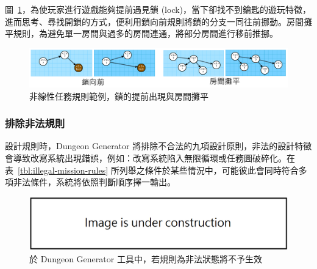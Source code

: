 圖~\ref{fig:missiongrammars-rules-nonlinear-example3}，為使玩家進行遊戲能夠提前遇見鎖 (lock)，當下卻找不到鑰匙的遊玩特徵，進而思考、尋找開鎖的方式，便利用鎖向前規則將鎖的分支一同往前挪動。房間攤平規則，為避免單一房間與過多的房間連通，將部分房間進行移前推挪。
 
\begin{figure}[ht]
  \begin{center}
    \includegraphics[width=1.0\textwidth]{figures/missiongrammars-rules-nonlinear-example3.png}
    \caption{非線性任務規則範例，鎖的提前出現與房間攤平}
    \label{fig:missiongrammars-rules-nonlinear-example3}
  \end{center}
\end{figure}



\subsubsection{排除非法規則}
\label{sssec:method-missiongrammars-rules-illegals}

設計規則時，Dungeon Generator 將排除不合法的九項設計原則，非法的設計特徵會導致改寫系統出現錯誤，例如：改寫系統陷入無限循環或任務圖破碎化。在表~\ref{tbl:illegal-mission-rules} 所列舉之條件於某些情況中，可能彼此會同時符合多項非法條件，系統將依照判斷順序擇一輸出。

\begin{figure}[ht]
  \begin{center}
    \includegraphics[width=1.0\textwidth]{figures/under_construction.png}
    \caption{於 Dungeon Generator 工具中，若規則為非法狀態將不予生效}
    \label{fig:missiongrammars-illegal-rules}
  \end{center}
\end{figure}

